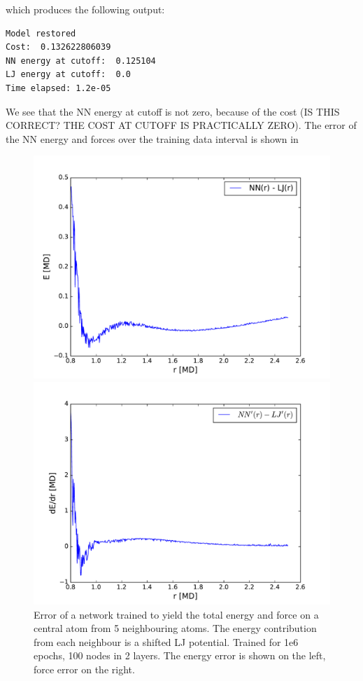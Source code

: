 \documentclass[twoside,english]{uiofysmaster}
\begin{document}
which produces the following output: 
\begin{lstlisting}
Model restored
Cost:  0.132622806039
NN energy at cutoff:  0.125104
LJ energy at cutoff:  0.0
Time elapsed: 1.2e-05
\end{lstlisting}
We see that the NN energy at cutoff is not zero, because of the cost (IS THIS CORRECT? THE COST AT CUTOFF IS PRACTICALLY ZERO).
The error of the NN energy and forces over the training data interval is shown in 
\begin{figure}[H]
\begin{minipage}[t]{0.48\linewidth}
  \includegraphics[width=\textwidth]{Figures/Tests/manyNeighbourEnergyError.pdf}
\end{minipage}
\quad
\begin{minipage}[t]{0.48\linewidth}
\includegraphics[width=\textwidth]{Figures/Tests/manyNeighbourForceError.pdf}
\end{minipage}
  \caption{Error of a network trained to yield the total energy and force on a central atom from 5 neighbouring atoms. 
           The energy contribution from each neighbour is a shifted LJ potential. Trained for 1e6 epochs, 100 nodes
           in 2 layers. The energy error is shown on the left, force error on the right.}
\label{fig:errorManyNeighbourNN}
\end{figure}
\end{document}
